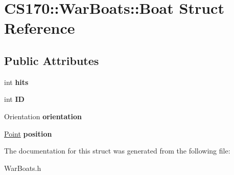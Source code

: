 \hypertarget{struct_c_s170_1_1_war_boats_1_1_boat}{\section{C\-S170\-:\-:War\-Boats\-:\-:Boat Struct Reference}
\label{struct_c_s170_1_1_war_boats_1_1_boat}
}
\subsection*{Public Attributes}
\begin{DoxyCompactItemize}
\item 
\hypertarget{struct_c_s170_1_1_war_boats_1_1_boat_a8c99f2164a2a9e4fbdfd2f3031b523dc}{int {\bfseries hits}}\label{struct_c_s170_1_1_war_boats_1_1_boat_a8c99f2164a2a9e4fbdfd2f3031b523dc}

\item 
\hypertarget{struct_c_s170_1_1_war_boats_1_1_boat_a47598ee0dc886b3019c7d854fba04ce4}{int {\bfseries I\-D}}\label{struct_c_s170_1_1_war_boats_1_1_boat_a47598ee0dc886b3019c7d854fba04ce4}

\item 
\hypertarget{struct_c_s170_1_1_war_boats_1_1_boat_a638a0b8a78a69661109d88b197696a21}{Orientation {\bfseries orientation}}\label{struct_c_s170_1_1_war_boats_1_1_boat_a638a0b8a78a69661109d88b197696a21}

\item 
\hypertarget{struct_c_s170_1_1_war_boats_1_1_boat_a94019de7178f4952a4e7812a1768a19b}{\hyperlink{struct_c_s170_1_1_war_boats_1_1_point}{Point} {\bfseries position}}\label{struct_c_s170_1_1_war_boats_1_1_boat_a94019de7178f4952a4e7812a1768a19b}

\end{DoxyCompactItemize}


The documentation for this struct was generated from the following file\-:\begin{DoxyCompactItemize}
\item 
War\-Boats.\-h\end{DoxyCompactItemize}
